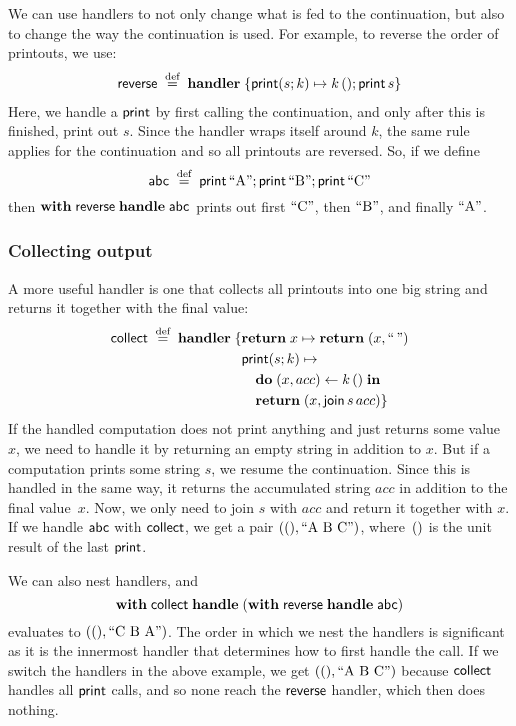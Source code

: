 \documentclass{article}
\begin{document}
We can use handlers to not only change what is fed to the continuation, but also
to change the way the continuation is used. For example, to reverse the order of printouts,
we use:
%
\begin{align*}
  \kst{reverse} \defeq \handler \{
    \opclause[\print]{s}{k} k \, \unt; \print \, s
  \}
\end{align*}
%
Here, we handle a $\print$ by first calling the continuation, and only after
this is finished, print out $s$. Since the handler wraps itself around $k$, the
same rule applies for the continuation and so all printouts are reversed.
So, if we define
\[
  \kst{abc} \defeq \print \, \str{A}; \print \, \str{B}; \print \, \str{C}
\]
then $\withhandle{\kst{reverse}}{\kst{abc}}$ prints out first
$\str{C}$, then $\str{B}$, and finally $\str{A}$.

\subsubsection{Collecting output}
\label{sec:collect}

A more useful handler is one that collects all printouts into one big string
and returns it together with the final value:
%
\begin{align*}
  \kst{collect} \defeq \handler \{
  & \retclause{x} \return (x, \str{\,}) \\
  & \opclause[\print]{s}{k} \\
  &\quad \seq{(x, acc)}{k \, \unt} \\
  &\quad \return (x, \kst{join} \, s \, acc)
  \}
\end{align*}
%
If the handled computation does not print anything and just returns some
value~$x$, we need to handle it by returning an empty string in addition to $x$.
But if a computation prints some string $s$, we resume the continuation. Since
this is handled in the same way, it returns the accumulated string $acc$ in
addition to the final value~$x$. Now, we only need to join $s$ with $acc$ and
return it together with $x$. If we handle $\kst{abc}$ with $\kst{collect}$, we
get a pair $(\unt, \str{A B C})$, where~$\unt$ is the unit result of the last
$\print$.

We can also nest handlers, and
%
\[
  \withhandle{\kst{collect}}{(\withhandle{\kst{reverse}}{\kst{abc}})}
\]
%
evaluates to $(\unt, \str{C B A})$. The order in which we nest the handlers is
significant as it is the innermost handler that determines how to first handle the
call. If we switch the handlers in the above example, we get
$(\unt, \str{A B C})$ because $\kst{collect}$ handles all $\print$ calls,
and so none reach the $\kst{reverse}$ handler, which then does nothing.
\end{document}
